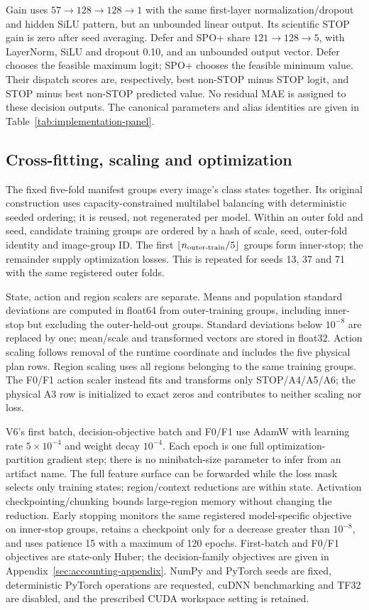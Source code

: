 Gain uses $57\!\to\!128\!\to\!128\!\to\!1$ with the same first-layer
normalization/dropout and hidden SiLU pattern, but an unbounded linear
output. Its scientific STOP gain is zero after seed averaging. Defer and
SPO+ share $121\!\to\!128\!\to\!5$, with LayerNorm, SiLU and dropout
0.10, and an unbounded output vector. Defer chooses the feasible maximum
logit; SPO+ chooses the feasible minimum value. Their dispatch scores are,
respectively, best non-STOP minus STOP logit, and STOP minus best non-STOP
predicted value. No residual MAE is assigned to these decision outputs.
The canonical parameters and alias identities are given in
Table~\ref{tab:implementation-panel}.

\subsection{Cross-fitting, scaling and optimization}
The fixed five-fold manifest groups every image's class states together.
Its original construction uses capacity-constrained multilabel balancing
with deterministic seeded ordering; it is reused, not regenerated per
model. Within an outer fold and seed, candidate training groups are ordered
by a hash of scale, seed, outer-fold identity and image-group ID. The first
$\lfloor n_{\rm outer\text{-}train}/5\rfloor$ groups form inner-stop;
the remainder supply optimization losses. This is repeated for seeds 13,
37 and 71 with the same registered outer folds.

State, action and region scalers are separate. Means and population standard
deviations are computed in float64 from outer-training groups, including
inner-stop but excluding the outer-held-out groups. Standard deviations
below $10^{-8}$ are replaced by one; mean/scale and transformed vectors
are stored in float32. Action scaling follows removal of the runtime
coordinate and includes the five physical plan rows. Region scaling uses
all regions belonging to the same training groups. The F0/F1 action scaler
instead fits and transforms only STOP/A4/A5/A6; the physical A3 row is
initialized to exact zeros and contributes to neither scaling nor loss.

V6's first batch, decision-objective batch and F0/F1 use AdamW with learning
rate $5\times10^{-4}$ and weight decay $10^{-4}$. Each epoch is one full
optimization-partition gradient step; there is no minibatch-size parameter
to infer from an artifact name. The full feature surface can be forwarded
while the loss mask selects only training states; region/context reductions
are within state. Activation checkpointing/chunking bounds large-region
memory without changing the reduction. Early stopping monitors the same
registered model-specific objective on inner-stop groups, retains a
checkpoint only for a decrease greater than $10^{-8}$, and uses patience
15 with a maximum of 120 epochs. First-batch and F0/F1 objectives are
state-only Huber; the decision-family objectives are given in
Appendix~\ref{sec:accounting-appendix}. NumPy and PyTorch seeds are fixed,
deterministic PyTorch operations are requested, cuDNN benchmarking and TF32
are disabled, and the prescribed CUDA workspace setting is retained.

